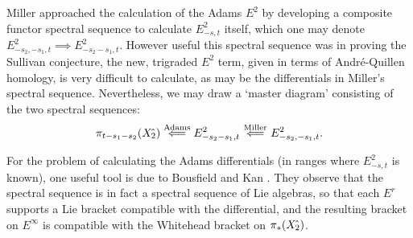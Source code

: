 \documentclass[11pt]{article}
\theoremstyle{plain}
\begin{document}
Miller \cite{MillerSullivanConjecture.pdf} approached the calculation of the Adams $E^2$ by developing a composite functor spectral sequence to calculate $E^2_{-s,t}$ itself, which one may denote $E^2_{-s_2,-s_1,t}\implies E^2_{-s_2-s_1,t}$. However useful this spectral sequence was in proving the Sullivan conjecture, the new, trigraded $E^2$ term, given in terms of Andr\'e-Quillen homology, is very difficult to calculate, as may be the differentials in Miller's spectral sequence. Nevertheless, we may draw a `master diagram' consisting of the two spectral sequences:
\[\pi_{t-s_1-s_2}(X{\hat{\,}_\textup{\!\!2}})\overset{\textup{Adams}}{\impliedby}E^2_{-s_2-s_1,t}\overset{\textup{Miller}}{\impliedby} E^2_{-s_2,-s_1,t}.\]

For the problem of calculating the Adams differentials (in ranges where $E^2_{-s,t}$ is known), one useful tool is due to Bousfield and Kan \cite{BK_pairings_products.pdf}. They observe that the spectral sequence is in fact a spectral sequence of Lie algebras, so that each $E^r$ supports a Lie bracket compatible with the differential, and the resulting bracket on $E^\infty$ is compatible with the Whitehead bracket on $\pi_*(X{\hat{\,}_\textup{\!\!2}})$.
\end{document}
